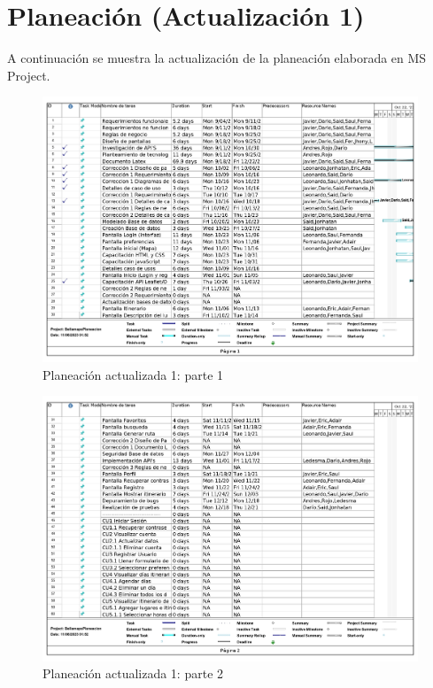 \documentclass{article}
\begin{document}
\section{\textcolor{azul}{Planeación (Actualización 1)}}
A continuación se muestra la actualización de la planeación elaborada en MS Project.
\begin{figure}[h]
    \centering
    \includegraphics[width=1\linewidth]{BellamapsPlaneacionA1_1.jpg}
    \caption{Planeación actualizada 1: parte 1}
    \label{fig:Planeación actualizada 1 parte 1}
\end{figure}
\begin{figure}[h]
    \centering
    \includegraphics[width=1\linewidth]{BellamapsPlaneacionA1_2.jpg}
    \caption{Planeación actualizada 1: parte 2}
    \label{fig:Planeación actualizada 1  parte 2}
\end{figure}
\end{document}
